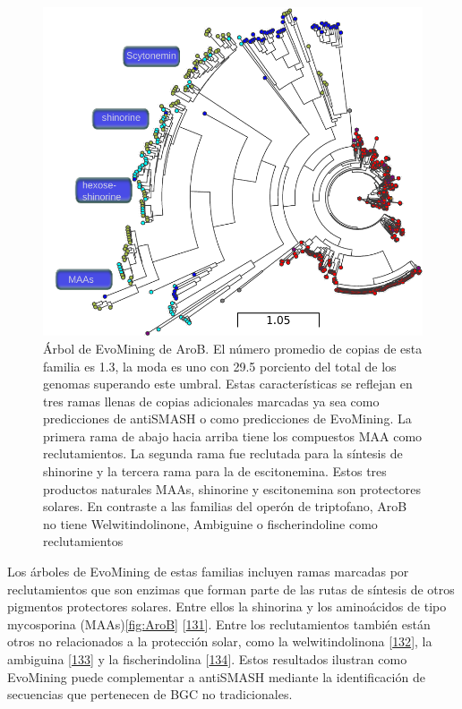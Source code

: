 \documentclass[12pt,twoside]{reedthesis}
\begin{document}
  \begin{figure}[h!tbp]
  \centering
  \includegraphics[angle = 0,scale = .9]{chapter2/AroB.pdf}
  \caption[AroB en Cianobacteria]{\footnotesize{Árbol de EvoMining de AroB. El número promedio de copias de esta familia es 1.3, la moda es uno con 29.5 porciento del total de los genomas superando este umbral. Estas características se reflejan en tres ramas llenas de copias adicionales marcadas ya sea como predicciones de antiSMASH o como predicciones de EvoMining. La primera rama de abajo hacia arriba tiene los compuestos MAA como reclutamientos. La segunda rama fue reclutada para la síntesis de shinorine y la tercera rama para la de escitonemina. Estos tres productos naturales MAAs, shinorine y escitonemina son protectores solares. En contraste a las familias del operón de triptofano, AroB no tiene Welwitindolinone, Ambiguine o fischerindoline como reclutamientos}}
  \label{fig:AroB}
  \end{figure}
  
  Los árboles de EvoMining de estas familias incluyen ramas marcadas por
  reclutamientos que son enzimas que forman parte de las rutas de síntesis
  de otros pigmentos protectores solares. Entre ellos la shinorina y los
  aminoácidos de tipo mycosporina (MAAs)\autoref{fig:AroB}
  {[}\protect\hyperlink{ref-balskus_genetic_2010}{131}{]}. Entre los
  reclutamientos también están otros no relacionados a la protección
  solar, como la welwitindolinona
  {[}\protect\hyperlink{ref-hillwig_identification_2014}{132}{]}, la
  ambiguina
  {[}\protect\hyperlink{ref-li_hapalindole_ambiguine_2015}{133}{]} y la
  fischerindolina {[}\protect\hyperlink{ref-li_decoding_2017}{134}{]}.
  Estos resultados ilustran como EvoMining puede complementar a antiSMASH
  mediante la identificación de secuencias que pertenecen de BGC no
  tradicionales.
  
\end{document}
